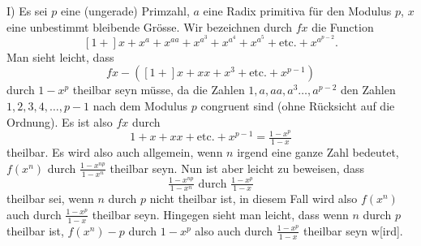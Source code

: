 \NoSourceHead
{}
\par\indent I) Es sei $p$ eine (ungerade) Primzahl, $a$ eine Radix primitiva für den Modulus $p$, $x$ eine unbestimmt bleibende Grösse. Wir bezeichnen durch $fx$ die Function
\[
[1+]x+x^a+x^{aa}+x^{a^3}+x^{a^4}+x^{a^5}+\text{etc.}+x^{a^{p-2}}.
\]
\noindent Man sieht leicht, dass
\[
fx-([1+]x+xx+x^3+\text{etc.}+x^{p-1})
\]
\noindent durch $1-x^p$ theilbar seyn müsse, da die Zahlen $1,a,aa,a^3\ldots,a^{p-2}$ den Zahlen $1,\allowbreak2,\allowbreak3,\allowbreak4,\allowbreak\ldots,\allowbreak p-1$ nach dem Modulus $p$ congruent sind (ohne Rücksicht auf die Ordnung). Es ist also $fx$ durch
\[
1+x+xx+\text{etc.}+x^{p-1}=\tfrac{1-x^p}{1-x}
\]
\noindent theilbar. Es wird also auch allgemein, wenn $n$ irgend eine ganze Zahl bedeutet, $f(x^n)$ durch $\frac{1-x^{np}}{1-x^n}$ theilbar seyn. Nun ist aber leicht zu beweisen, dass
\[
\tfrac{1-x^{np}}{1-x^n}\text{ durch }\tfrac{1-x^p}{1-x}
\]
\noindent theilbar sei, wenn $n$ durch $p$ nicht theilbar ist, in diesem Fall wird also $f(x^n)$ auch durch $\frac{1-x^p}{1-x}$ theilbar seyn. Hingegen sieht man leicht, dass wenn $n$
\clearpage
{}
\noindent durch $p$ theilbar ist, $f(x^n)-p$ durch $1-x^p$ also auch durch $\frac{1-x^p}{1-x}$ theilbar seyn w[ird].

